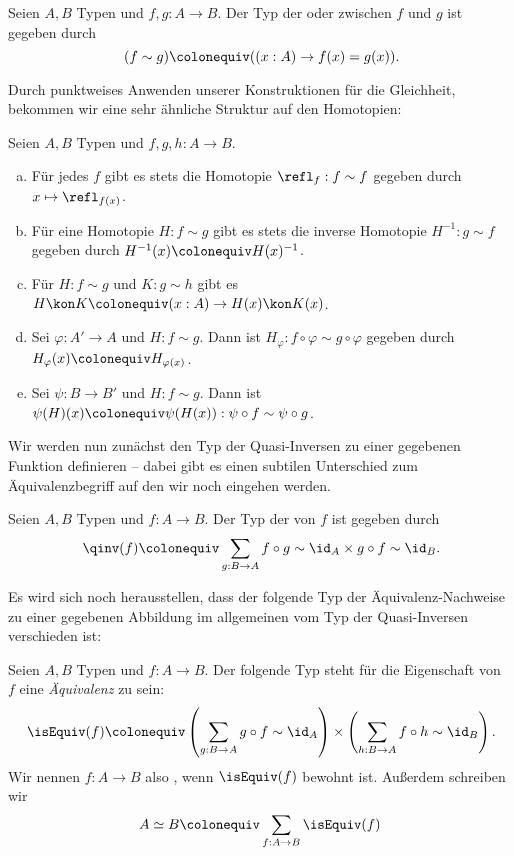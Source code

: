 \begin{definition}
  Seien $A,B$ Typen und $f,g:A\to B$.
  Der Typ der 
  oder  zwischen $f$ und $g$
  ist gegeben durch
  \[
    (f\sim g)\colonequiv( (x:A)\to f(x)=g(x))\rlap{.}
  \]
\end{definition}

Durch punktweises Anwenden unserer Konstruktionen für die Gleichheit,
bekommen wir eine sehr ähnliche Struktur auf den Homotopien:

\begin{definition}
  Seien $A,B$ Typen und $f,g,h:A\to B$.
  \begin{enumerate}[(a)]
  \item Für jedes $f$ gibt es stets die Homotopie $\refl_f:f\sim f$ gegeben durch $x\mapsto \refl_{f(x)}$.
  \item Für eine Homotopie $H:f\sim g$ gibt es stets die inverse Homotopie $H^{-1}:g\sim f$ gegeben durch $H^{-1}(x)\colonequiv H(x)^{-1}$.
  \item Für $H:f\sim g$ und $K:g\sim h$ gibt es $H\kon K\colonequiv (x:A)\to H(x)\kon K(x)$.
  \item Sei $\varphi:A'\to A$ und $H:f\sim g$.
    Dann ist $H_\varphi:f\circ \varphi \sim g\circ \varphi$ gegeben durch $H_\varphi(x)\colonequiv H_{\varphi(x)}$.
  \item Sei $\psi:B\to B'$ und $H:f\sim g$. Dann ist $\psi(H)(x)\colonequiv \psi(H(x)):\psi\circ f\sim\psi\circ g$.
  \end{enumerate}
\end{definition}

Wir werden nun zunächst den Typ der Quasi-Inversen zu einer gegebenen Funktion definieren
-- dabei gibt es einen subtilen Unterschied zum Äquivalenzbegriff auf den wir noch eingehen werden.

\begin{definition}
  Seien $A,B$ Typen und $f:A\to B$. Der Typ der  von $f$ ist gegeben durch
  \[
    \qinv(f)\colonequiv \sum_{g:B\to A} f\circ g\sim \id_A\times g\circ f\sim \id_B\rlap{.}
  \]
\end{definition}

Es wird sich noch herausstellen, dass der folgende Typ der Äquivalenz-Nachweise zu einer gegebenen Abbildung im allgemeinen vom Typ der Quasi-Inversen verschieden ist:

\begin{definition}
  Seien $A,B$ Typen und $f:A\to B$. Der folgende Typ steht für die Eigenschaft von $f$ eine \emph{Äquivalenz} zu sein:
  \[
    \isEquiv(f) \colonequiv \left(\sum_{g:B\to A} g\circ f\sim\id_A \right)\times \left(\sum_{h:B\to A} f\circ h\sim\id_B\right)\rlap{.}
    \]
    Wir nennen $f:A\to B$ also , wenn $\isEquiv(f)$ bewohnt ist.
    Außerdem schreiben wir
    \[
      A\simeq B\colonequiv \sum_{f:A\to B}\isEquiv(f)
    \]
\end{definition}

